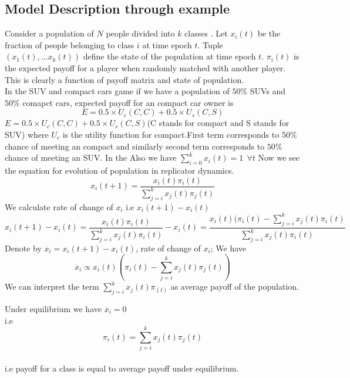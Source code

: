 \documentclass[letterpaper,english,12pt]{article}
\begin{document}
\subsection{Model Description through example}
Consider a population of $N$ people divided into $k$ classes . Let $x_i(t)$ be the fraction of people belonging to class $i$ at time epoch $t$.  Tuple $(x_1(t),\dots x_k(t))$ define the state of the population at time epoch $t$. $\pi_i(t)$ is the expected payoff for a player when randomly matched with another player. This is clearly a function of payoff matrix and state of population. \\
In the SUV and compact cars game if we have a population of $50\%$ SUVs and $50\%$ comapct cars, expected payoff for an compact car owner is \\
\begin{equation}
E=0.5\times U_c(C,C) + 0.5 \times U_s(C,S)
\end{equation}
$E=0.5\times U_c(C,C) + 0.5 \times U_s(C,S)$(C stands for compact and S stands for SUV) where $U_c$ is the utility function for compact.First term corresponds to $50\%$ chance of meeting an compact and similarly second term corresponds to $50\%$ chance of meeting an SUV. In the
Also we have $\sum_{i=0}^{k}x_i(t) = 1 ~~ \forall t$
Now we see the equation for evolution of population in replicator dynamics.
\begin{equation}
    x_i(t+1) = \frac{x_i(t)\pi_i(t)}{\sum_{j=i}^{k}x_j(t)\pi_j(t)}
\end{equation}
We calculate rate of change of $x_i$ i.e $x_i(t+1)-x_i(t)$  
\begin{equation}
    x_i(t+1) - x_i(t) =  \frac{x_i(t)\pi_i(t)}{\sum_{j=i}^{k}x_j(t)\pi_i(t)} -x_i(t)
    = \frac{x_i(t)(\pi_i(t)-\sum_{j=i}^{k}x_j(t)\pi_i(t)}{\sum_{j=i}^{k}x_j(t)\pi_i(t)}
\end{equation}
Denote by $\overset{.}x_i = x_i(t+1) - x_i(t)$, rate of change of $x_i$; 
We have
\begin{equation}
\overset{.}x_i \propto x_i(t)(\pi_i(t)-\sum_{j=i}^{k}x_j(t)\pi_j(t)) 
\end{equation}
We can interpret the term $\sum_{j=i}^{k}x_j(t)\pi_(t)$ as average payoff of the population. 

Under equilibrium we have $\overset{.}x_i =0 $  \\
 i.e 
 \begin{equation}\label{rdeqm}
    \pi_i(t)=\sum_{j=i}^{k}x_j(t)\pi_j(t)
 \end{equation} \\
 i.e payoff for a class is equal to average payoff under equilibrium.
 
\end{document}
